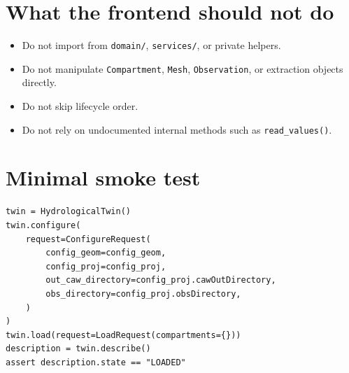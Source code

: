 \documentclass[11pt]{article}
\begin{document}
\section{What the frontend should not do}

\begin{itemize}
    \item Do not import from \texttt{domain/}, \texttt{services/}, or private helpers.
    \item Do not manipulate \texttt{Compartment}, \texttt{Mesh}, \texttt{Observation}, or extraction objects directly.
    \item Do not skip lifecycle order.
    \item Do not rely on undocumented internal methods such as \texttt{read\_values()}.
\end{itemize}

\section{Minimal smoke test}

\begin{verbatim}
twin = HydrologicalTwin()
twin.configure(
    request=ConfigureRequest(
        config_geom=config_geom,
        config_proj=config_proj,
        out_caw_directory=config_proj.cawOutDirectory,
        obs_directory=config_proj.obsDirectory,
    )
)
twin.load(request=LoadRequest(compartments={}))
description = twin.describe()
assert description.state == "LOADED"
\end{verbatim}
\end{document}
